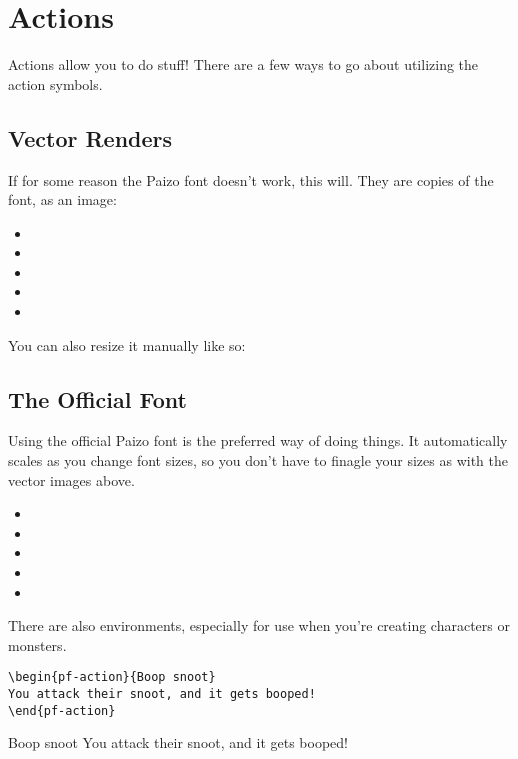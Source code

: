 \chapter{Actions}

\begin{multicols}{2}

Actions allow you to do stuff!
There are a few ways to go about utilizing the action symbols.

\section{Vector Renders}

If for some reason the Paizo font doesn't work, this will.
They are copies of the font, as an image:

\begin{itemize}
  \item \showmacro{\actionIcon}
  \item \showmacro{\activityTwoIcon}
  \item \showmacro{\activityThreeIcon}
  \item \showmacro{\freeActionIcon}
  \item \showmacro{\reactionIcon}
\end{itemize}

You can also resize it manually like so: \showmacro{\actionIcon[2]}

\section{The Official Font}

Using the official Paizo font is the preferred way of doing things.
It automatically scales as you change font sizes, so you don't have to finagle your sizes as with the vector images above.

\begin{itemize}
  \item \showmacro{\oneAction}
  \item \showmacro{\twoAction}
  \item \showmacro{\threeAction}
  \item \showmacro{\freeAction}
  \item \showmacro{\reaction}
\end{itemize}

There are also environments, especially for use when you're creating characters or monsters.

\hrulefill{}
\begin{verbatim}
\begin{pf-action}{Boop snoot}
You attack their snoot, and it gets booped!
\end{pf-action}
\end{verbatim}
\begin{pf-action}{Boop snoot}
You attack their snoot, and it gets booped!
\end{pf-action}


\end{multicols}
